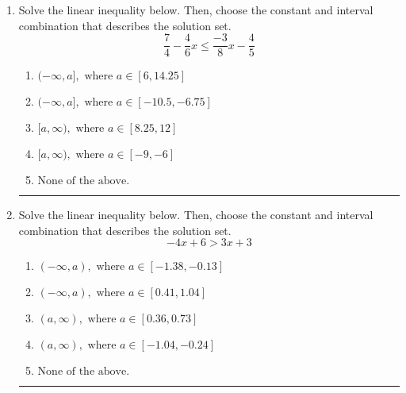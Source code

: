 \documentclass[14pt]{extbook}
\newcommand{\litem}[1]{\item#1\hspace*{-1cm}\rule{\textwidth}{0.4pt}}
\begin{document}
\begin{enumerate}
{\begin{enumerate}[label=\Alph*.]
\end{enumerate} }
\litem{
Solve the linear inequality below. Then, choose the constant and interval combination that describes the solution set.\[ \frac{7}{4} - \frac{4}{6} x \leq \frac{-3}{8} x - \frac{4}{5} \]\begin{enumerate}[label=\Alph*.]
\item \( (-\infty, a], \text{ where } a \in [6, 14.25] \)
\item \( (-\infty, a], \text{ where } a \in [-10.5, -6.75] \)
\item \( [a, \infty), \text{ where } a \in [8.25, 12] \)
\item \( [a, \infty), \text{ where } a \in [-9, -6] \)
\item \( \text{None of the above}. \)

\end{enumerate} }
\litem{
Solve the linear inequality below. Then, choose the constant and interval combination that describes the solution set.\[ -4x + 6 > 3x + 3 \]\begin{enumerate}[label=\Alph*.]
\item \( (-\infty, a), \text{ where } a \in [-1.38, -0.13] \)
\item \( (-\infty, a), \text{ where } a \in [0.41, 1.04] \)
\item \( (a, \infty), \text{ where } a \in [0.36, 0.73] \)
\item \( (a, \infty), \text{ where } a \in [-1.04, -0.24] \)
\item \( \text{None of the above}. \)

\end{enumerate} }
\end{enumerate}
\end{document}
